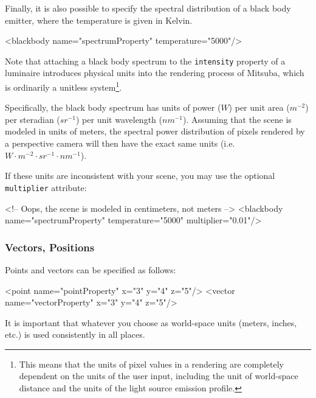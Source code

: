Finally, it is also possible to specify the spectral distribution of a black body emitter, where the temperature is given in Kelvin.
\begin{xml}
<blackbody name="spectrumProperty" temperature="5000"/>
\end{xml}
Note that attaching a black body spectrum to the \texttt{intensity} property
of a luminaire introduces physical units into the rendering process of 
Mitsuba, which is ordinarily a unitless system\footnote{This means that the 
units of pixel values in a rendering are completely dependent on the units of 
the user input, including the unit of world-space distance and the units of 
the light source emission profile.}.

Specifically, the black body spectrum has units of power ($W$) per 
unit area ($m^{-2}$) per steradian ($sr^{-1}$) per unit wavelength ($nm^{-1}$).
Assuming that the scene is modeled in units of meters, 
the spectral power distribution of pixels rendered by a perspective 
camera will then have the exact same units (i.e. $W\cdot m^{-2}\cdot sr^{-1} \cdot nm^{-1}$).

If these units are inconsistent with your scene, you may use the
optional \texttt{multiplier} attribute: 
\begin{xml}
<!-- Oops, the scene is modeled in centimeters, not meters -->
<blackbody name="spectrumProperty" temperature="5000" multiplier="0.01"/>
\end{xml}

\subsubsection{Vectors, Positions}
Points and vectors can be specified as follows:
\begin{xml}
<point name="pointProperty" x="3" y="4" z="5"/>
<vector name="vectorProperty" x="3" y="4" z="5"/>
\end{xml}
It is important that whatever you choose as world-space units (meters, inches, etc.) is 
used consistently in all places.
